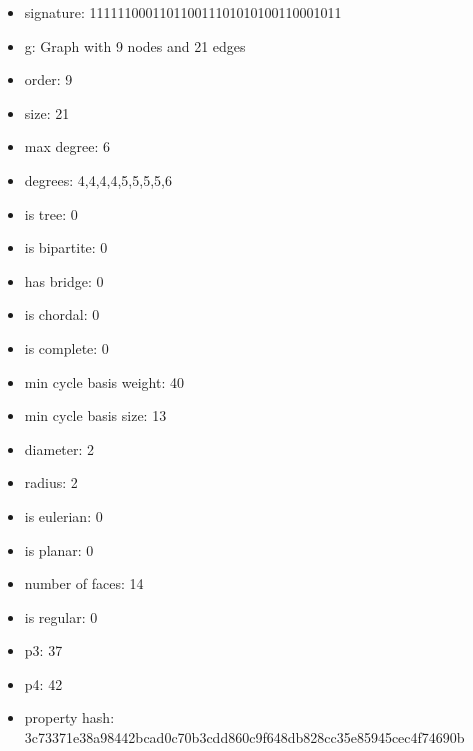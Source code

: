 \newpage
\begin{figure}
\end{figure}
\begin{itemize}
\item signature: 111111000110110011101010100110001011
\item g: Graph with 9 nodes and 21 edges
\item order: 9
\item size: 21
\item max degree: 6
\item degrees: 4,4,4,4,5,5,5,5,6
\item is tree: 0
\item is bipartite: 0
\item has bridge: 0
\item is chordal: 0
\item is complete: 0
\item min cycle basis weight: 40
\item min cycle basis size: 13
\item diameter: 2
\item radius: 2
\item is eulerian: 0
\item is planar: 0
\item number of faces: 14
\item is regular: 0
\item p3: 37
\item p4: 42
\item property hash: 3c73371e38a98442bcad0c70b3cdd860c9f648db828cc35e85945cec4f74690b
\end{itemize}
